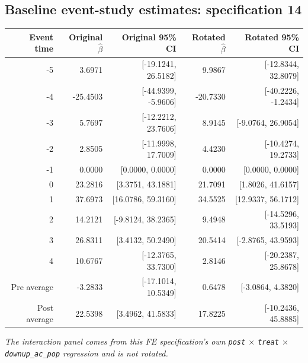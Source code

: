 \documentclass[10pt]{article}
\begin{document}
\subsection*{Baseline event-study estimates: specification 14}
\begin{center}
\scriptsize
\begin{tabular}{r rr rr}
\toprule
Event time & Original $\hat\beta$ & Original 95\% CI & Rotated $\hat\beta$ & Rotated 95\% CI \\
\midrule
-5 & 3.6971 & [-19.1241, 26.5182] & 9.9867 & [-12.8344, 32.8079] \\
-4 & -25.4503 & [-44.9399, -5.9606] & -20.7330 & [-40.2226, -1.2434] \\
-3 & 5.7697 & [-12.2212, 23.7606] & 8.9145 & [-9.0764, 26.9054] \\
-2 & 2.8505 & [-11.9998, 17.7009] & 4.4230 & [-10.4274, 19.2733] \\
-1 & 0.0000 & [0.0000, 0.0000] & 0.0000 & [0.0000, 0.0000] \\
0 & 23.2816 & [3.3751, 43.1881] & 21.7091 & [1.8026, 41.6157] \\
1 & 37.6973 & [16.0786, 59.3160] & 34.5525 & [12.9337, 56.1712] \\
2 & 14.2121 & [-9.8124, 38.2365] & 9.4948 & [-14.5296, 33.5193] \\
3 & 26.8311 & [3.4132, 50.2490] & 20.5414 & [-2.8765, 43.9593] \\
4 & 10.6767 & [-12.3765, 33.7300] & 2.8146 & [-20.2387, 25.8678] \\
\midrule
Pre average & -3.2833 & [-17.1014, 10.5349] & 0.6478 & [-3.0864, 4.3820] \\
Post average & 22.5398 & [3.4962, 41.5833] & 17.8225 & [-10.2436, 45.8885] \\
\bottomrule
\end{tabular}
\end{center}
\medskip
\textit{The interaction panel comes from this FE specification's own \texttt{post} $\times$ \texttt{treat} $\times$ \texttt{downup\_ac\_pop} regression and is not rotated.}
\clearpage
\end{document}
